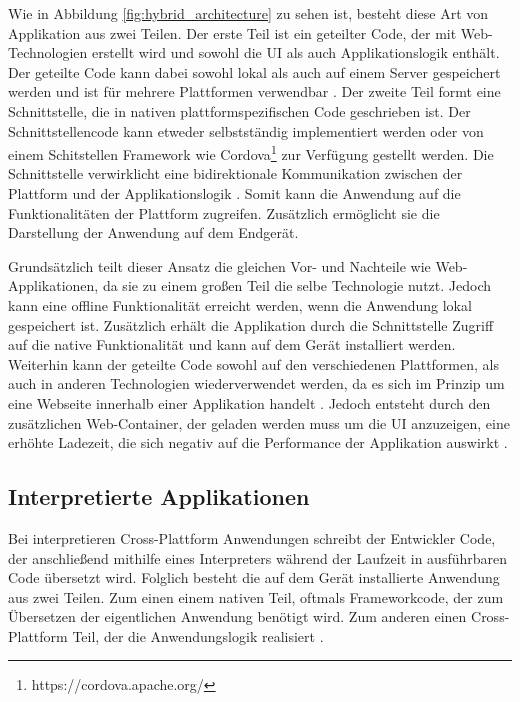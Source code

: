 Wie in Abbildung \ref{fig:hybrid_architecture} zu sehen ist, besteht diese Art von Applikation aus zwei Teilen.
Der erste Teil ist ein geteilter Code, der mit Web-Technologien erstellt wird und sowohl die UI als auch Applikationslogik enthält. Der geteilte Code kann dabei sowohl lokal als auch auf einem Server gespeichert werden und ist für mehrere Plattformen verwendbar \cite{2017hybrid_approach_end}.
Der zweite Teil formt eine Schnittstelle, die in nativen plattformspezifischen Code geschrieben ist. Der Schnittstellencode kann etweder selbstständig implementiert werden oder von einem Schitstellen Framework wie Cordova\footnote{https://cordova.apache.org/} zur Verfügung gestellt werden. Die Schnittstelle verwirklicht eine bidirektionale Kommunikation zwischen der Plattform und der Applikationslogik \cite{ELKASSAS2017163}. Somit kann die Anwendung auf die Funktionalitäten der Plattform zugreifen. Zusätzlich ermöglicht sie die Darstellung der Anwendung auf dem Endgerät. 

Grundsätzlich teilt dieser Ansatz die gleichen Vor- und Nachteile wie Web-Applikationen, da sie zu einem großen Teil die selbe Technologie nutzt. Jedoch kann eine offline Funktionalität erreicht werden, wenn die Anwendung lokal gespeichert ist. Zusätzlich erhält die Applikation durch die Schnittstelle Zugriff auf die native Funktionalität und kann auf dem Gerät installiert werden. Weiterhin kann der geteilte Code sowohl auf den verschiedenen Plattformen, als auch in anderen Technologien wiederverwendet werden, da es sich im Prinzip um eine Webseite innerhalb einer Applikation handelt \cite{IEEE_development_classes}. Jedoch entsteht durch den zusätzlichen Web-Container, der geladen werden muss um die UI anzuzeigen, eine erhöhte Ladezeit, die sich negativ auf die Performance der Applikation auswirkt \cite{IEEE_development_classes}.

\subsection{Interpretierte Applikationen}
\label{cha:3_2_interpretiert}
Bei interpretieren Cross-Plattform Anwendungen schreibt der Entwickler Code, der anschließend mithilfe eines Interpreters während der Laufzeit in ausführbaren Code übersetzt wird. Folglich besteht die auf dem Gerät installierte Anwendung aus zwei Teilen. Zum einen einem nativen Teil, oftmals Frameworkcode, der zum Übersetzen der eigentlichen Anwendung benötigt wird. Zum anderen einen Cross-Plattform Teil, der die Anwendungslogik realisiert \cite{IEEE_development_classes}.

